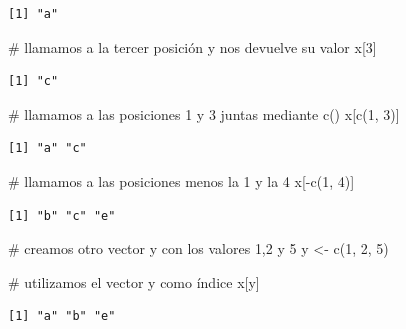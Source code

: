 \documentclass[
  spanish,
  letterpaper,
  DIV=11,
  numbers=noendperiod]{scrreprt}
\newenvironment{Shaded}{\begin{snugshade}}{\end{snugshade}}
\newcommand{\CommentTok}[1]{\textcolor[rgb]{0.37,0.37,0.37}{#1}}
\newcommand{\DecValTok}[1]{\textcolor[rgb]{0.68,0.00,0.00}{#1}}
\newcommand{\FunctionTok}[1]{\textcolor[rgb]{0.28,0.35,0.67}{#1}}
\newcommand{\NormalTok}[1]{\textcolor[rgb]{0.00,0.23,0.31}{#1}}
\newcommand{\OtherTok}[1]{\textcolor[rgb]{0.00,0.23,0.31}{#1}}
\newcommand{\SpecialCharTok}[1]{\textcolor[rgb]{0.37,0.37,0.37}{#1}}
\begin{document}
\begin{verbatim}
[1] "a"
\end{verbatim}

\begin{Shaded}
\begin{Highlighting}[]
\CommentTok{\# llamamos a la tercer posición y nos devuelve su valor}
\NormalTok{x[}\DecValTok{3}\NormalTok{]}
\end{Highlighting}
\end{Shaded}

\begin{verbatim}
[1] "c"
\end{verbatim}

\begin{Shaded}
\begin{Highlighting}[]
\CommentTok{\# llamamos a las posiciones 1 y 3 juntas mediante c()}
\NormalTok{x[}\FunctionTok{c}\NormalTok{(}\DecValTok{1}\NormalTok{, }\DecValTok{3}\NormalTok{)]}
\end{Highlighting}
\end{Shaded}

\begin{verbatim}
[1] "a" "c"
\end{verbatim}

\begin{Shaded}
\begin{Highlighting}[]
\CommentTok{\# llamamos a las posiciones menos la 1 y la 4}
\NormalTok{x[}\SpecialCharTok{{-}}\FunctionTok{c}\NormalTok{(}\DecValTok{1}\NormalTok{, }\DecValTok{4}\NormalTok{)]}
\end{Highlighting}
\end{Shaded}

\begin{verbatim}
[1] "b" "c" "e"
\end{verbatim}

\begin{Shaded}
\begin{Highlighting}[]
\CommentTok{\# creamos otro vector y con los valores 1,2 y 5}
\NormalTok{y }\OtherTok{\textless{}{-}} \FunctionTok{c}\NormalTok{(}\DecValTok{1}\NormalTok{, }\DecValTok{2}\NormalTok{, }\DecValTok{5}\NormalTok{)}

\CommentTok{\# utilizamos el vector y como índice}
\NormalTok{x[y]}
\end{Highlighting}
\end{Shaded}

\begin{verbatim}
[1] "a" "b" "e"
\end{verbatim}
\end{document}
